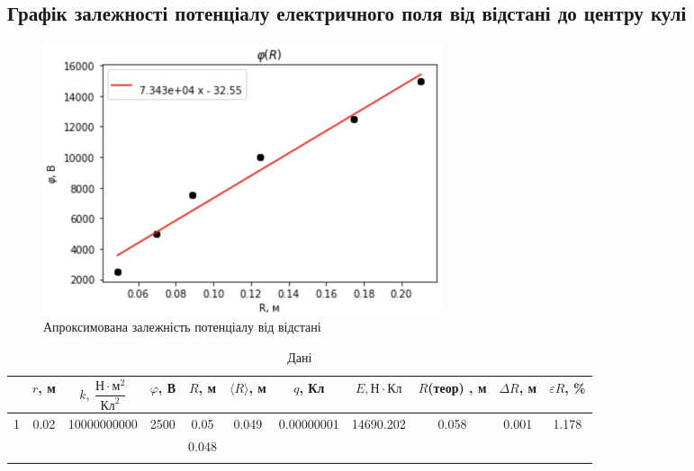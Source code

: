 \documentclass[a4paper,12pt]{article}
\begin{document}
\begin{justify}
	\subsection{Графік залежності потенціалу електричного поля від відстані до центру кулі}
	\begin{figure}[!h]
		\centering
			\includegraphics[height=80mm]{media/graph11aaa.png}
    		\caption{Апроксимована залежність потенціалу від відстані}
			\label{fig:8a}
    	\end{figure}
\begin{table}[!h]
\label{table:table1}
	\begin{flushright}
		\caption{Дані}
	\end{flushright}
\begin{adjustwidth}{-1.25cm}{}
\begin{tabular}{|c|c|c|c|c|c|c|c|c|c|c|}
\hline
                   & $r$, м                 & $k,\>\dfrac{\textrm{Н}\cdot\textrm{м}^2}{\textrm{Кл}^2}$ & $\varphi$,  В          & $R$, м & $\langle R\rangle$, м  & $q$, Кл                     & $E, \textrm{Н}\cdot\textrm{Кл}$ & $R$(теор) , м          & $\Delta R$, м          & $\varepsilon R$,  \%   \\ \hline
\multirow{3}{*}{1} & \multirow{18}{*}{0.02} & \multirow{18}{*}{10000000000}                            & \multirow{3}{*}{2500}  & 0.05   & \multirow{3}{*}{0.049} & \multirow{3}{*}{0.00000001} & \multirow{18}{*}{14690.202}     & \multirow{3}{*}{0.058} & \multirow{3}{*}{0.001} & \multirow{3}{*}{1.178} \\ \cline{5-5}
                   &                        &                                                          &                        & 0.048  &                        &                             &                                 &                        &                        &                        \\ \cline{5-5}

\end{tabular}
\end{adjustwidth}
\end{table}
\end{justify}
\end{document}
